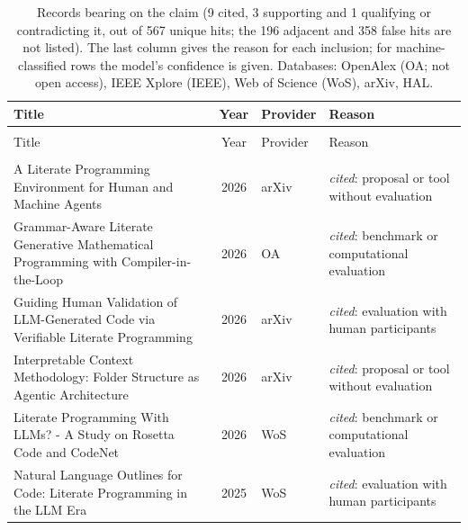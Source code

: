 
\begingroup\footnotesize
\begin{longtable}{@{}%
  >{\raggedright\arraybackslash}p{}c%
  >{\raggedright\arraybackslash}p{}%
  >{\raggedright\arraybackslash}p{}@{}}
\caption{Records bearing on the claim (9 cited, 3 supporting and 1 qualifying or contradicting it, out of 567 unique hits; the 196 adjacent and 358 false hits are not listed). The last column gives the reason for each inclusion; for machine-classified rows the model's confidence is given. Databases: OpenAlex (OA; not open access), IEEE Xplore (IEEE), Web of Science (WoS), arXiv, HAL.}\label{tab:lp-llm-direct}\\
\toprule
Title & Year & Provider & Reason \\
\midrule
\endfirsthead
\multicolumn{4}{@{}l}{\emph{\tablename~\thetable{} (cont.)}}\\
\toprule
Title & Year & Provider & Reason \\
\midrule
\endhead
\midrule \multicolumn{4}{r@{}}{\emph{continued on next page}}\\
\endfoot
\bottomrule
\endlastfoot
A Literate Programming Environment for Human and Machine Agents & 2026 & arXiv & \emph{cited}: proposal or tool without evaluation \\
Grammar-Aware Literate Generative Mathematical Programming with Compiler-in-the-Loop & 2026 & OA & \emph{cited}: benchmark or computational evaluation \\
Guiding Human Validation of LLM-Generated Code via Verifiable Literate Programming & 2026 & arXiv & \emph{cited}: evaluation with human participants \\
Interpretable Context Methodology: Folder Structure as Agentic Architecture & 2026 & arXiv & \emph{cited}: proposal or tool without evaluation \\
Literate Programming With LLMs? - A Study on Rosetta Code and CodeNet & 2026 & WoS & \emph{cited}: benchmark or computational evaluation \\
Natural Language Outlines for Code: Literate Programming in the LLM Era & 2025 & WoS & \emph{cited}: evaluation with human participants \\

\end{longtable}
